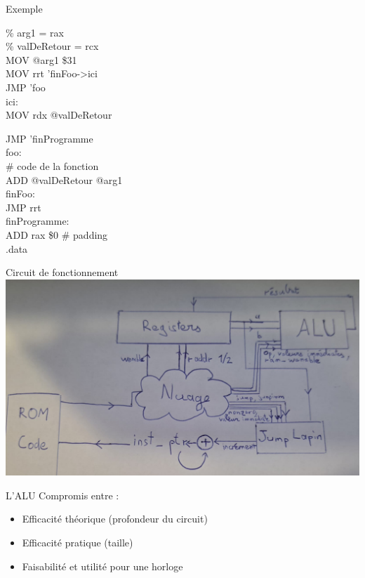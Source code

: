 \documentclass[12pt]{beamer}
\begin{document}
\begin{frame}{Exemple}

    \begin{minipage}[t]{0.48\linewidth}

\% arg1 = rax\\
\% valDeRetour = rcx\\


MOV @arg1 \$31\\
MOV rrt 'finFoo->ici\\
JMP 'foo\\
ici:\\
MOV rdx @valDeRetour\\

    \end{minipage}\hfill
    \begin{minipage}[t]{0.48\linewidth}
JMP 'finProgramme\\

foo:\\
\# code de la fonction\\
ADD @valDeRetour @arg1\\
finFoo:\\
JMP rrt\\


finProgramme:\\
ADD rax \$0  \# padding\\

.data
        \end{minipage}

\end{frame}


\begin{frame}{Circuit de fonctionnement}
    \includegraphics[scale=0.2]{Schema_structure.jpg}
\end{frame}


\begin{frame}{L'ALU}
	Compromis entre :
	\begin{itemize}
	\item Efficacité théorique  (profondeur du circuit)
	\item Efficacité pratique (taille)
	\item Faisabilité et utilité pour une horloge
	\end{itemize}
\end{frame}
\end{document}
